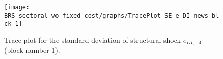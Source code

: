 \begin{figure}[H]
\centering
  \texttt{[image: BRS\_sectoral\_wo\_fixed\_cost/graphs/TracePlot\_SE\_e\_DI\_news\_blck\_1]}\\
    \caption{Trace plot for the standard deviation of structural shock ${e_{DI,-4}}$ (block number 1).}
\end{figure}
